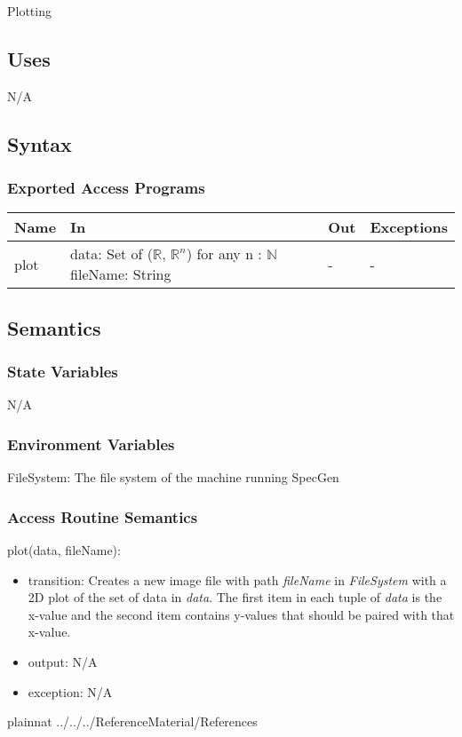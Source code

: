 \documentclass[12pt, titlepage]{article}
\newcommand{\progname}{SpecGen}
\begin{document}
Plotting

\subsection{Uses}

N/A

\subsection{Syntax}

\subsubsection{Exported Access Programs}

\begin{center}
\begin{tabular}{p{2cm} p{4cm} p{3cm} p{3cm}}
\hline
\textbf{Name} & \textbf{In} & \textbf{Out} & \textbf{Exceptions} \\
\hline
plot & data: Set of ($\mathbb{R}$, $\mathbb{R}^n$) 
  \newline \hspace*{1em}for any n : $\mathbb{N}$
  \newline fileName: String & - & - \\
\hline
\end{tabular}
\end{center}

\subsection{Semantics}

\subsubsection{State Variables}
N/A

\subsubsection{Environment Variables}
FileSystem: The file system of the machine running \progname

\subsubsection{Access Routine Semantics}

\noindent plot(data, fileName):
\begin{itemize}
\item transition: Creates a new image file with path \emph{fileName} in 
  \emph{FileSystem} with a 2D plot of the set of data in \emph{data}.  The 
  first item in each tuple of \emph{data} is the x-value and the second item 
  contains y-values that should be paired with that x-value.    
\item output: N/A
\item exception: N/A
\end{itemize}

\newpage

 {plainnat}
 {../../../ReferenceMaterial/References}
\end{document}
